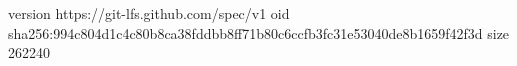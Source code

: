 version https://git-lfs.github.com/spec/v1
oid sha256:994c804d1c4c80b8ca38fddbb8ff71b80c6ccfb3fc31e53040de8b1659f42f3d
size 262240
